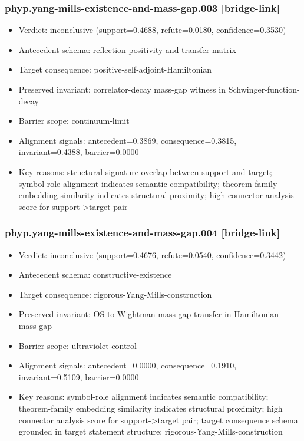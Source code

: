 \documentclass[
]{article}
\providecommand{\tightlist}{%
  \setlength{\itemsep}{0pt}\setlength{\parskip}{0pt}}
\begin{document}
\subsubsection{phyp.yang-mills-existence-and-mass-gap.003
{[}bridge-link{]}}\label{phypyang-mills-existence-and-mass-gap003-bridge-link}

\begin{itemize}
\tightlist
\item
  Verdict: inconclusive (support=0.4688, refute=0.0180,
  confidence=0.3530)
\item
  Antecedent schema: reflection-positivity-and-transfer-matrix
\item
  Target consequence: positive-self-adjoint-Hamiltonian
\item
  Preserved invariant: correlator-decay mass-gap witness in
  Schwinger-function-decay
\item
  Barrier scope: continuum-limit
\item
  Alignment signals: antecedent=0.3869, consequence=0.3815,
  invariant=0.4388, barrier=0.0000
\item
  Key reasons: structural signature overlap between support and target;
  symbol-role alignment indicates semantic compatibility; theorem-family
  embedding similarity indicates structural proximity; high connector
  analysis score for support-\textgreater target pair
\end{itemize}

\subsubsection{phyp.yang-mills-existence-and-mass-gap.004
{[}bridge-link{]}}\label{phypyang-mills-existence-and-mass-gap004-bridge-link}

\begin{itemize}
\tightlist
\item
  Verdict: inconclusive (support=0.4676, refute=0.0540,
  confidence=0.3442)
\item
  Antecedent schema: constructive-existence
\item
  Target consequence: rigorous-Yang-Mills-construction
\item
  Preserved invariant: OS-to-Wightman mass-gap transfer in
  Hamiltonian-mass-gap
\item
  Barrier scope: ultraviolet-control
\item
  Alignment signals: antecedent=0.0000, consequence=0.1910,
  invariant=0.5109, barrier=0.0000
\item
  Key reasons: symbol-role alignment indicates semantic compatibility;
  theorem-family embedding similarity indicates structural proximity;
  high connector analysis score for support-\textgreater target pair;
  target consequence schema grounded in target statement structure:
  rigorous-Yang-Mills-construction
\end{itemize}
\end{document}
